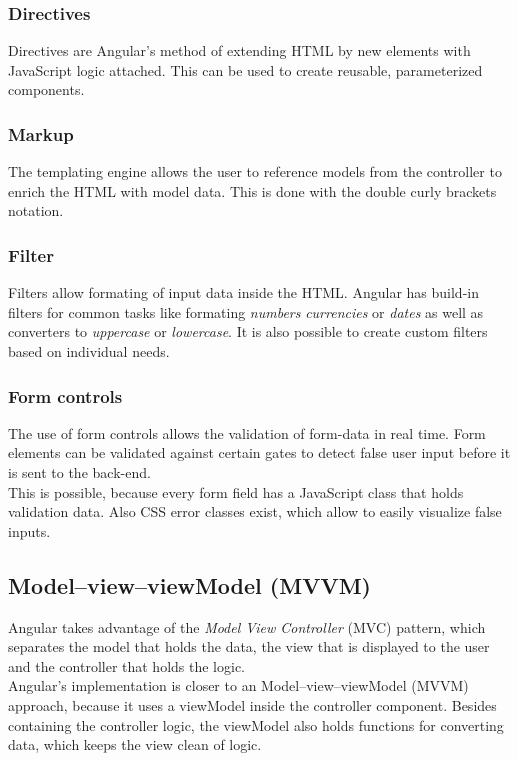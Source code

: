 \subsubsection{Directives}
Directives are Angular's method of extending HTML by new elements with JavaScript logic attached. This can be used to create reusable, parameterized components.

\subsubsection{Markup}
The templating engine allows the user to reference models from the controller to enrich the HTML with model data. This is done with the double curly brackets notation.

\subsubsection{Filter}
Filters allow formating of input data inside the HTML. Angular has build-in filters for common tasks like formating \textit{numbers} \textit{currencies} or \textit{dates} as well as converters to \textit{uppercase} or \textit{lowercase}. It is also possible to create custom filters based on individual needs.

\subsubsection{Form controls}
The use of form controls allows the validation of form-data in real time. Form elements can be validated against certain gates to detect false user input before it is sent to the back-end.\\
This is possible, because every form field has a JavaScript class that holds validation data. Also CSS error classes exist, which allow to easily visualize false inputs.


\subsection{Model–view–viewModel (MVVM)}
Angular takes advantage of the \textit{Model View Controller} (MVC) pattern, which separates the model that holds the data, the view that is displayed to the user and the controller that holds the logic.\\
Angular's implementation is closer to an Model–view–viewModel (MVVM) approach, because it uses a viewModel inside the controller component. Besides containing the controller logic, the viewModel also holds functions for converting data, which keeps the view clean of logic.

